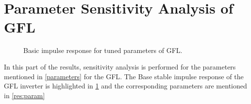 \section{Parameter Sensitivity Analysis of \gls{GFL}}


\begin{table}[ht]
\centering
\caption[Optimal GFL Parameters]{Optimal GFL Parameters}
\label{res:param}
\end{table}

\begin{figure}[ht]
\begin{center}
    \centering
   \nonindent
	\caption[Basic impulse response ]{Basic impulse response for tuned parameters of \gls{GFL}.}
	\label{res:base}
	\end{center}
\end{figure}
In this part of the results, sensitivity analysis is performed for the parameters mentioned in \ref{parameters} for the \gls{GFL}. The Base stable impulse response of the \gls{GFL} inverter is highlighted in \ref{res:base} and the corresponding parameters are mentioned in \ref{res:param}

